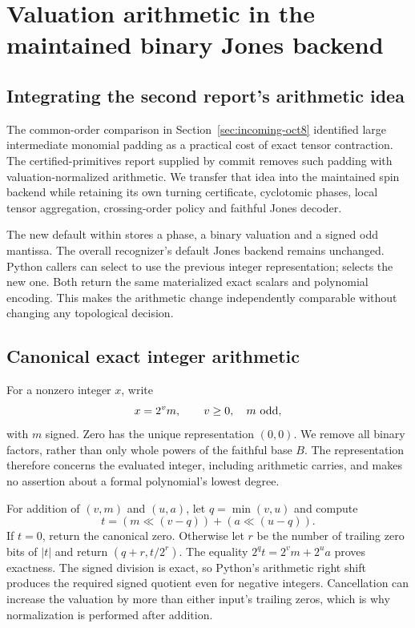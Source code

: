 \section{Valuation arithmetic in the maintained binary Jones backend}
\label{sec:spin-valuation}

\subsection{Integrating the second report's arithmetic idea}
The common-order comparison in Section~\ref{sec:incoming-oct8} identified
large intermediate monomial padding as a practical cost of exact tensor
contraction. The certified-primitives report supplied by commit
 removes such padding with valuation-normalized arithmetic.
We transfer that idea into the maintained spin backend while retaining its
own turning certificate, cyclotomic phases, local tensor aggregation,
crossing-order policy and faithful Jones decoder.

The new default within  stores a phase, a binary
valuation and a signed odd mantissa. The overall recognizer's default Jones
backend remains unchanged. Python callers can select
 to use the previous integer representation;
 selects the new one. Both return the same
materialized exact scalars and polynomial encoding. This makes the arithmetic
change independently comparable without changing any topological decision.

\subsection{Canonical exact integer arithmetic}
For a nonzero integer $x$, write
\[
 x=2^v m,\qquad v\ge0,\quad m\ \hbox{odd},
\]
with $m$ signed. Zero has the unique representation $(0,0)$. We remove
all binary factors, rather than only whole powers of the faithful base $B$.
The representation therefore concerns the evaluated integer, including
arithmetic carries, and makes no assertion about a formal polynomial's
lowest degree.

For addition of $(v,m)$ and $(u,a)$, let $q=\min(v,u)$ and compute
\[
 t=(m\ll(v-q))+(a\ll(u-q)).
\]
If $t=0$, return the canonical zero. Otherwise let $r$ be the number of
trailing zero bits of $|t|$ and return $(q+r,t/2^r)$. The equality
$2^qt=2^vm+2^ua$ proves exactness. The signed division is exact, so Python's
arithmetic right shift produces the required signed quotient even for negative
integers. Cancellation can increase the valuation by more than either input's
trailing zeros, which is why normalization is performed after addition.


